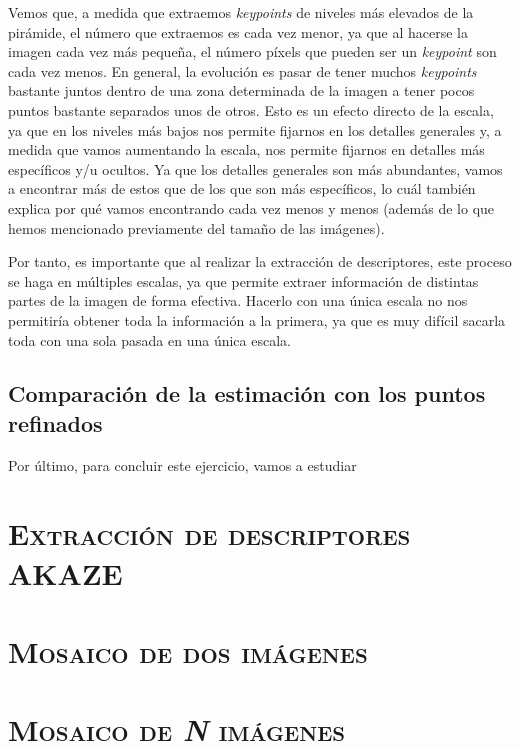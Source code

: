 \documentclass[11pt,a4paper]{article}
\begin{document}
Vemos que, a medida que extraemos \textit{keypoints} de niveles más elevados
de la pirámide, el número que extraemos es cada vez menor, ya que al hacerse la
imagen cada vez más pequeña, el número píxels que pueden ser un \textit{keypoint}
son cada vez menos. En general, la evolución es pasar de tener muchos \textit{keypoints}
bastante juntos dentro de una zona determinada de la imagen a tener pocos puntos bastante separados unos de otros.
Esto es un efecto directo de la escala, ya que en los niveles más bajos nos permite fijarnos
en los detalles generales y, a medida que vamos aumentando la escala, nos permite fijarnos
en detalles más específicos y/u ocultos. Ya que los detalles generales son más abundantes,
vamos a encontrar más de estos que de los que son más específicos, lo cuál también explica por
qué vamos encontrando cada vez menos y menos (además de lo que hemos mencionado previamente
del tamaño de las imágenes).

Por tanto, es importante que al realizar
la extracción de descriptores, este proceso se haga en múltiples escalas, ya que
permite extraer información de distintas partes de la imagen de forma efectiva.
Hacerlo con una única escala no nos permitiría obtener toda la información a la primera,
ya que es muy difícil sacarla toda con una sola pasada en  una única escala.

\subsection{Comparación de la estimación con los puntos refinados}

Por último, para concluir este ejercicio, vamos a estudiar

\section{\textsc{Extracción de descriptores AKAZE}}

\section{\textsc{Mosaico de dos imágenes}}

\section{\textsc{Mosaico de \textit{N} imágenes}}

\newpage



\end{document}
